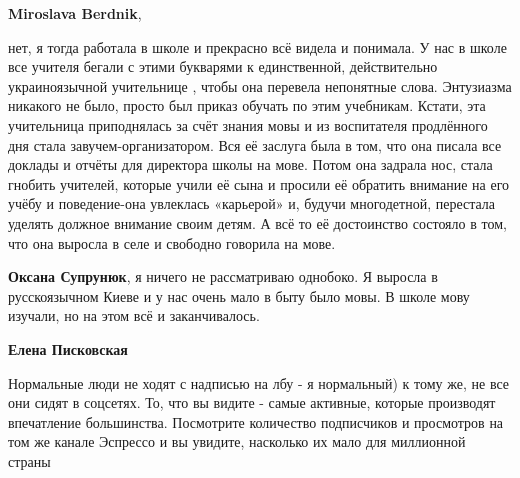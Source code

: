 \begin{itemize}
\begin{itemize}
 
\textbf{Miroslava Berdnik}, 

нет, я тогда работала в школе и прекрасно всё видела и понимала. У нас в школе
все учителя бегали с этими букварями к единственной, действительно
украиноязычной учительнице , чтобы она перевела непонятные слова. Энтузиазма
никакого не было, просто был приказ обучать по этим учебникам. Кстати, эта
учительница приподнялась за счёт знания мовы и из воспитателя продлённого дня
стала завучем-организатором. Вся её заслуга была в том, что она писала все
доклады и отчёты для директора школы на мове. Потом она задрала нос, стала
гнобить учителей, которые учили её сына и просили её обратить внимание на его
учёбу и поведение-она увлеклась «карьерой» и, будучи многодетной, перестала
уделять должное внимание своим детям. А всё то её достоинство состояло в том,
что она выросла в селе и свободно говорила на мове.

 
\textbf{Оксана Супрунюк}, я ничего не рассматриваю однобоко. Я выросла в
русскоязычном Киеве и у нас очень мало в быту было мовы. В школе мову изучали,
но на этом всё и заканчивалось.

 
\textbf{Елена Писковская} 

Нормальные люди не ходят с надписью на лбу - я нормальный) к тому же, не все
они сидят в соцсетях. То, что вы видите - самые активные, которые производят
впечатление большинства. Посмотрите количество подписчиков и просмотров на том
же канале Эспрессо и вы увидите, насколько их мало для миллионной страны


 

\end{itemize}
\end{itemize}

